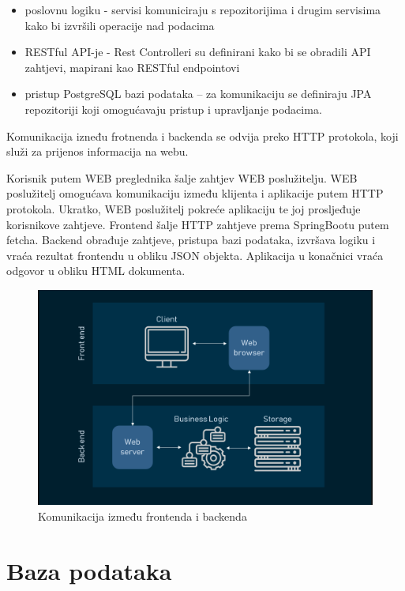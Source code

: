 	\begin{itemize}
		\item poslovnu logiku - servisi komuniciraju s repozitorijima i drugim servisima kako bi izvršili operacije nad podacima
		\item RESTful API-je - Rest Controlleri su definirani kako bi se obradili API zahtjevi, mapirani kao RESTful endpointovi
		\item pristup PostgreSQL bazi podataka – za komunikaciju se definiraju JPA repozitoriji koji omogućavaju pristup i upravljanje podacima.
	\end{itemize}
	
	\noindent Komunikacija izneđu frotnenda i backenda se odvija preko HTTP protokola, koji služi za prijenos informacija na webu.
	
	Korisnik putem WEB preglednika šalje zahtjev WEB poslužitelju. WEB poslužitelj omogućava komunikaciju između klijenta i aplikacije putem HTTP protokola. Ukratko, WEB poslužitelj pokreće aplikaciju te joj prosljeđuje korisnikove zahtjeve. Frontend šalje HTTP zahtjeve prema SpringBootu putem fetcha. Backend obrađuje zahtjeve, pristupa bazi podataka, izvršava logiku i vraća rezultat frontendu u obliku JSON objekta.  Aplikacija u konačnici vraća odgovor u obliku HTML dokumenta.
	
		\begin{figure}[H]
		\includegraphics[scale=0.5]{slike/komunikacija.png} %
		\centering
		\caption{Komunikacija između frontenda i backenda}
		\label{fig:komunikacija} %
		\end{figure}
	
				
		\section{Baza podataka}
			
